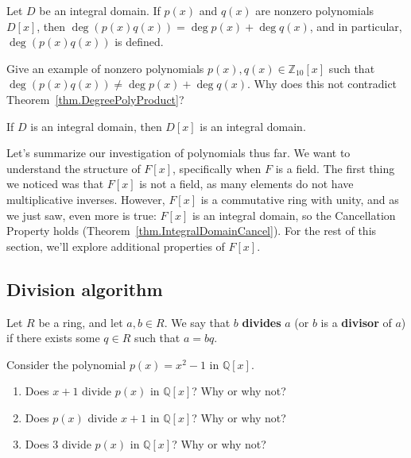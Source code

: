 \begin{theorem}\label{thm.DegreePolyProduct}
Let $D$ be an integral domain. If $p(x)$ and $q(x)$ are nonzero polynomials $D[x]$, then $\deg(p(x)q(x)) = \deg p(x) + \deg q(x)$, and in particular, $\deg(p(x)q(x))$ is defined.
\end{theorem}

\begin{problem}
Give an example of nonzero polynomials $p(x),q(x)\in \mathbb{Z}_{10}[x]$ such that $\deg(p(x)q(x)) \neq \deg p(x) + \deg q(x)$. Why does this not contradict Theorem~\ref{thm.DegreePolyProduct}?
\end{problem}

\begin{corollary}\label{cor.PolysOverIntegralDomains}
If $D$ is an integral domain, then $D[x]$ is an integral domain.
\end{corollary}

Let's summarize our investigation of polynomials thus far. We want to understand the structure of $F[x]$, specifically when $F$ is a field. The first thing we noticed was that $F[x]$ is not a field, as many elements do not have multiplicative inverses. However, $F[x]$ is a commutative ring with unity, and as we just saw, even more is true: $F[x]$ is an integral domain, so the Cancellation Property holds (Theorem~\ref{thm.IntegralDomainCancel}). For the rest of this section, we'll explore additional properties of $F[x]$.

\subsection{Division algorithm}

\begin{definition}
Let $R$ be a ring, and let $a,b\in R$. We say that $b$ \textbf{divides} $a$ (or $b$ is a \textbf{divisor} of $a$) if there exists some $q\in R$ such that $a = bq$.
\end{definition}

\begin{problem}
Consider the polynomial $p(x) = x^2 - 1$ in $\mathbb{Q}[x]$.
\begin{enumerate}
\item Does $x+1$ divide $p(x)$ in $\mathbb{Q}[x]$? Why or why not?
\item Does $p(x)$ divide $x+1$ in $\mathbb{Q}[x]$? Why or why not?
\item Does $3$ divide $p(x)$ in $\mathbb{Q}[x]$? Why or why not?
\end{enumerate}
\end{problem}

